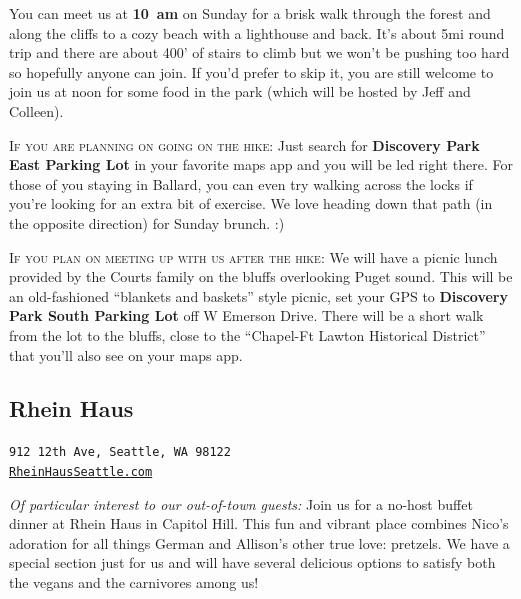 \documentclass[12pt]{article}
\begin{document}
You can meet us at \textbf{10~am} on Sunday for a brisk walk through the forest and along the cliffs
to a cozy beach with a lighthouse and back. It's about 5mi round trip and there are about 400' of stairs
to climb but we won't be pushing too hard so hopefully anyone can join. If you'd prefer to skip it, you are 
still welcome to join us at noon for some food in the park (which will be hosted by Jeff and Colleen).

\textsc{If you are planning on going on the hike:} Just search for \textbf{Discovery Park East Parking Lot} in your favorite maps app and you will be led right there. For those of you
staying in Ballard, you can even try walking across the locks if you're looking for an extra bit of exercise. We love heading
down that path (in the opposite direction) for Sunday brunch. :)

\textsc{If you plan on meeting up with us after the hike:} We will have a picnic lunch provided by the Courts family 
on the bluffs overlooking Puget sound. This will be an old-fashioned ``blankets and baskets'' style picnic, set your GPS 
to \textbf{Discovery Park South Parking Lot} off W Emerson Drive. There will be a short walk from the lot to the bluffs, 
close to the ``Chapel-Ft Lawton Historical District'' that you'll also see on your maps app.

\subsection{Rhein Haus}
\label{subsec-rheinhaus}
\begin{center}
    \texttt{912 12th Ave, Seattle, WA 98122\\\href{https://www.rheinhausseattle.com/}{RheinHausSeattle.com}}
\end{center}

\textit{Of particular interest to our out-of-town guests:} Join us for a no-host buffet dinner at Rhein Haus in Capitol Hill. This fun and vibrant place combines Nico's 
adoration for all things German and Allison’s other true love: pretzels. We have a special section just for us 
and will have several delicious options to satisfy both the vegans and the carnivores among us! 
\end{document}
